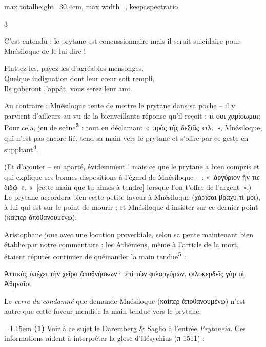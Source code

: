 \documentclass[11pt,twoside]{book}
\newcommand{\italique}[1]{\textit{#1}}
\newcommand{\citComm}[1]{\begin{quoting}[vskip=0.4pt,leftmargin=0.7em,rightmargin=0.2em]#1\end{quoting}}
\newcommand{\latin}[1]{\textit{#1}}
\newcommand{\marqueur}[1]{\textsuperscript{\color{rubricRed}\textbf{#1}}}
\begin{document}
\begin{adjustbox}{max totalheight=30.4cm, max width=\textwidth, keepaspectratio}
\begin{minipage}{\textwidth}
{\begin{multicols}{3}
\par\vspace{1.5pt}
\noindent C'est entendu : le prytane est concussionnaire mais il serait suicidaire pour Mnésiloque de le lui dire !
\citComm{Flattez-les, payez-les d'agréables mensonges,\\
Quelque indignation dont leur cœur soit rempli,\\
Ils goberont l'appât, vous serez leur ami.}
\par\vspace{1.5pt}
\noindent Au contraire : Mnésiloque tente de mettre le prytane dans sa poche -- il y parvient d'ailleurs au vu de la bienveillante réponse qu'il reçoit : τί σοι χαρίσωμαι;\\ Pour cela, jeu de scène\marqueur{3} : tout en déclamant «~πρὸς τῆς δεξιᾶς κτλ.~», Mnésiloque, qui n'est pas encore lié, tend sa main vers le prytane et s'offre par ce geste en suppliant\marqueur{4}.
\par\vspace{1.5pt}
\noindent (Et d'ajouter -- en aparté, évidemment ! mais ce que le prytane a bien compris et qui explique ses bonnes dispositions à l'égard de Mnésiloque -- : «~ἀργύριον ἤν τις διδῷ~», «~[cette main que tu aimes à tendre] lorsque l'on t'offre de l'argent~».)\\ Le prytane accordera bien cette petite faveur à Mnésiloque (χάρισαι βραχύ τί μοι), à lui qui est sur le point de mourir ; et Mnésiloque d'insister sur ce dernier point (καίπερ ἀποθανουμένῳ).
\par\vspace{1.5pt}
\noindent Aristophane joue avec une locution proverbiale, selon sa pente maintenant bien établie par notre commentaire : les Athéniens, même à l'article de la mort, étaient réputés continuer de quémander la main tendue\marqueur{5} :
\citComm{Ἀττικὸς ὑπέχει τὴν χεῖρα ἀποθνήσκων· ἐπὶ τῶν φιλαργύρων. φιλοκερδεῖς γὰρ οἱ Ἀθηναῖοι.}
\par\vspace{1.5pt}
\noindent Le \italique{verre du condamné} que demande Mnésiloque (καίπερ ἀποθανουμένῳ) n'est autre que cette faveur mendiée la main tendue vers le prytane.
\par\vspace{1.5pt}
\par\vspace{1.2pt}\par\nopagebreak\vspace{1pt}\noindent\hangindent=1.15em {\color{sepiaNote}\textbf{(1)}} Voir à ce sujet le Daremberg \& Saglio à l'entrée \latin{Prytaneia}. Ces informations aident à interpréter la glose d'Hésychius (π 1511) :

\end{multicols}}
\end{minipage}
\end{adjustbox}
\end{document}
